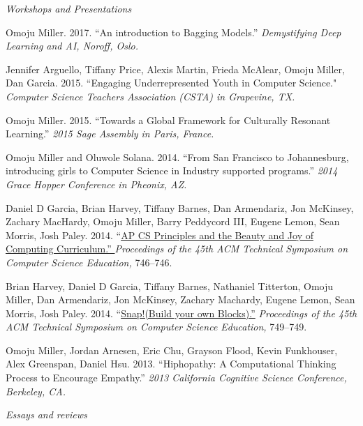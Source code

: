 \documentclass[11pt,article,oneside]{memoir}
\begin{document}
\bigskip

\noindent\emph{Workshops and Presentations  \vspace{0.05in}}


\ind Omoju Miller. 2017. ``An introduction to Bagging Models.'' \emph{Demystifying Deep Learning and AI, Noroff, Oslo.}

\ind Jennifer Arguello, Tiffany Price, Alexis Martin, Frieda McAlear, Omoju Miller, Dan Garcia. 2015. ``Engaging Underrepresented Youth in Computer Science."  \emph{Computer Science Teachers Association (CSTA) in Grapevine, TX.}

\ind Omoju Miller. 2015. ``Towards a Global Framework for Culturally Resonant Learning.'' \emph{2015 Sage Assembly in Paris, France.}

\ind Omoju Miller and Oluwole Solana. 2014. ``From San Francisco to Johannesburg, introducing girls to Computer Science in Industry supported programs.'' \emph{2014 Grace Hopper Conference in Pheonix, AZ.}

\ind Daniel D Garcia, Brian Harvey, Tiffany Barnes, Dan Armendariz, Jon McKinsey, Zachary MacHardy, Omoju Miller, Barry Peddycord III, Eugene Lemon, Sean Morris, Josh Paley. 2014. ``\href{http://dl.acm.org/citation.cfm?id=2539026}{AP CS Principles and the Beauty and Joy of Computing Curriculum.'' }\emph{Proceedings of the 45th ACM Technical Symposium on Computer Science Education,} 746--746.

\ind Brian Harvey, Daniel D Garcia, Tiffany Barnes, Nathaniel Titterton, Omoju Miller, Dan Armendariz, Jon McKinsey, Zachary Machardy, Eugene Lemon, Sean Morris, Josh Paley. 2014. ``\href{http://dl.acm.org/citation.cfm?id=2539022}{Snap!(Build your own Blocks).''} \emph{Proceedings of the 45th ACM Technical Symposium on Computer Science Education,} 749--749.

\ind Omoju Miller, Jordan Arnesen, Eric Chu, Grayson Flood, Kevin Funkhouser, Alex Greenspan, Daniel Hsu. 2013. ``Hiphopathy: A Computational Thinking Process to Encourage Empathy.'' \emph{2013 California Cognitive Science Conference, Berkeley, CA.}

\bigskip
\noindent\emph{Essays and reviews \vspace{0.05in}}

\end{document}
